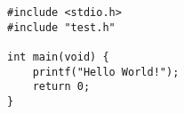 \documentclass{article}
\begin{document}
\begin{lstlisting}
#include <stdio.h>
#include "test.h"

int main(void) {
    printf("Hello World!");
    return 0;
}
\end{lstlisting}
\end{document}
